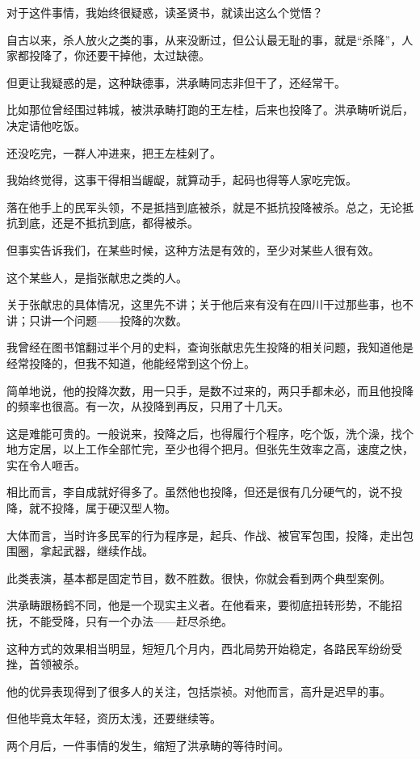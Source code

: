 \begin{multicols}{\theparacolNo}
对于这件事情，我始终很疑惑，读圣贤书，就读出这么个觉悟？

自古以来，杀人放火之类的事，从来没断过，但公认最无耻的事，就是“杀降”，人家都投降了，你还要干掉他，太过缺德。

但更让我疑惑的是，这种缺德事，洪承畴同志非但干了，还经常干。

比如那位曾经围过韩城，被洪承畴打跑的王左桂，后来也投降了。洪承畴听说后，决定请他吃饭。

还没吃完，一群人冲进来，把王左桂剁了。

我始终觉得，这事干得相当龌龊，就算动手，起码也得等人家吃完饭。

落在他手上的民军头领，不是抵挡到底被杀，就是不抵抗投降被杀。总之，无论抵抗到底，还是不抵抗到底，都得被杀。

但事实告诉我们，在某些时候，这种方法是有效的，至少对某些人很有效。

这个某些人，是指张献忠之类的人。

关于张献忠的具体情况，这里先不讲；关于他后来有没有在四川干过那些事，也不讲；只讲一个问题——投降的次数。

我曾经在图书馆翻过半个月的史料，查询张献忠先生投降的相关问题，我知道他是经常投降的，但我不知道，他能经常到这个份上。

简单地说，他的投降次数，用一只手，是数不过来的，两只手都未必，而且他投降的频率也很高。有一次，从投降到再反，只用了十几天。

这是难能可贵的。一般说来，投降之后，也得履行个程序，吃个饭，洗个澡，找个地方定居，以上工作全部忙完，至少也得个把月。但张先生效率之高，速度之快，实在令人咂舌。

相比而言，李自成就好得多了。虽然他也投降，但还是很有几分硬气的，说不投降，就不投降，属于硬汉型人物。

大体而言，当时许多民军的行为程序是，起兵、作战、被官军包围，投降，走出包围圈，拿起武器，继续作战。

此类表演，基本都是固定节目，数不胜数。很快，你就会看到两个典型案例。

洪承畴跟杨鹤不同，他是一个现实主义者。在他看来，要彻底扭转形势，不能招抚，不能受降，只有一个办法——赶尽杀绝。

这种方式的效果相当明显，短短几个月内，西北局势开始稳定，各路民军纷纷受挫，首领被杀。

他的优异表现得到了很多人的关注，包括崇祯。对他而言，高升是迟早的事。

但他毕竟太年轻，资历太浅，还要继续等。

两个月后，一件事情的发生，缩短了洪承畴的等待时间。


\end{multicols}
